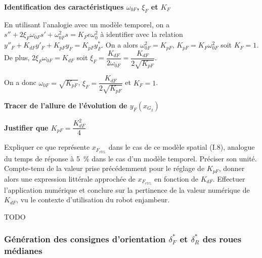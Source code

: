 \documentclass[11pt]{article}
\begin{document}
\begin{UPSTIcorrige}

\textbf{Identification des  caractéristiques $\omega_{0F}$, $\xi_F$ et $K_F$}

En utilisant l'analogie avec un modèle temporel, on a $s'' + 2\xi_F\omega_{0F} s' + \omega_{0F}^2 s = K_Fe\omega_0^2$ à identifier avec la relation $y''_F+K_{dF}y'_F+K_{pF}y_F=K_{pF}y^*_F$.
On a alors  $\omega_{0F}^2 =K_{pF}$, $K_{pF} = K_F\omega_{0F}^2$ soit $K_F=1$. De plus, $2\xi_F\omega_{0F} = K_{dF}$ soit $\xi_F = \dfrac{K_{dF}}{2\omega_{0F}}= \dfrac{K_{dF}}{2\sqrt{K_{pF}}}$.

On a donc $\omega_{0F}=\sqrt{K_{pF}}$, $\xi_F=\dfrac{K_{dF}}{2\sqrt{K_{pF}}}$ et $K_F=1$.


\textbf{Tracer de l’allure de l’évolution de  $y_F\left(x_{G_2}\right)$}


\textbf{Justifier que $K_{pF}=\dfrac{K^2_{dF}}{4}$}

\end{UPSTIcorrige}


\UPSTIquestion Expliquer ce que représente $x_{F_{r5\%}}$ dans le cas de ce modèle spatial (I.8), analogue du temps de réponse à \SI{5}{\%} dans le cas d’un modèle temporel. Préciser son unité. Compte-tenu de la valeur prise précédemment pour le réglage de $K_{pF}$, donner alors une expression littérale approchée de  $x_{F_{r5\%}}$ en fonction de $K_{dF}$. Effectuer
l’application numérique et conclure sur la pertinence de la valeur numérique de $K_{dF}$, vu le contexte d’utilisation
du robot enjambeur.

\begin{UPSTIcorrige}
TODO
\end{UPSTIcorrige}

\subsubsection{Génération des consignes d'orientation $\delta_F^*$ et $\delta_R^*$ des roues médianes}
\end{document}
